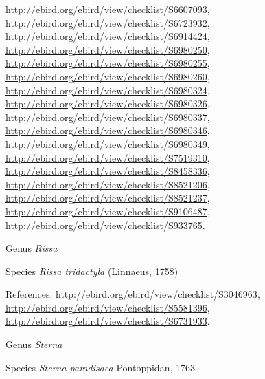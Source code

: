 \documentclass[9pt, article]{memoir}
\begin{document}
\begin{multicols}{2}
\url{http://ebird.org/ebird/view/checklist/S6607093}, 
\url{http://ebird.org/ebird/view/checklist/S6723932}, 
\url{http://ebird.org/ebird/view/checklist/S6914424}, 
\url{http://ebird.org/ebird/view/checklist/S6980250}, 
\url{http://ebird.org/ebird/view/checklist/S6980255}, 
\url{http://ebird.org/ebird/view/checklist/S6980260}, 
\url{http://ebird.org/ebird/view/checklist/S6980324}, 
\url{http://ebird.org/ebird/view/checklist/S6980326}, 
\url{http://ebird.org/ebird/view/checklist/S6980337}, 
\url{http://ebird.org/ebird/view/checklist/S6980346}, 
\url{http://ebird.org/ebird/view/checklist/S6980349}, 
\url{http://ebird.org/ebird/view/checklist/S7519310}, 
\url{http://ebird.org/ebird/view/checklist/S8458336}, 
\url{http://ebird.org/ebird/view/checklist/S8521206}, 
\url{http://ebird.org/ebird/view/checklist/S8521237}, 
\url{http://ebird.org/ebird/view/checklist/S9106487}, 
\url{http://ebird.org/ebird/view/checklist/S933765}.

\vspace{6pt}\noindent\hspace{30pt}Genus \textit{Rissa}


\vspace{6pt}\noindent\hspace{36pt}Species \textit{Rissa tridactyla} (Linnaeus, 1758)


\vspace{6pt}References: 
\url{http://ebird.org/ebird/view/checklist/S3046963}, 
\url{http://ebird.org/ebird/view/checklist/S5581396}, 
\url{http://ebird.org/ebird/view/checklist/S6731933}.

\vspace{6pt}\noindent\hspace{30pt}Genus \textit{Sterna}


\vspace{6pt}\noindent\hspace{36pt}Species \textit{Sterna paradisaea} Pontoppidan, 1763



\end{multicols}
\end{document}

